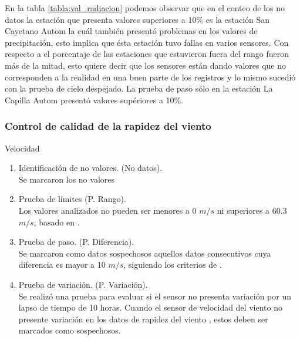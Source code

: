 En la tabla \ref{tabla:val_radiacion} podemos observar que en el conteo de los no datos la estación que presenta valores superiores a 10\% es la estación San Cayetano Autom la cuál también presentó problemas en los valores de precipitación, esto implica que ésta estación tuvo fallas en varios sensores. Con respecto a el porcentaje de las estaciones que estuvieron fuera del rango fueron más de la mitad, esto quiere decir que los sensores están dando valores que no corresponden a la realidad en una buen parte de los registros y lo mismo sucedió con la prueba de cielo despejado. La prueba de paso sólo en la estación La Capilla Autom presentó valores supériores a 10\%.

\subsubsection{Control de calidad de la rapidez del viento}

Velocidad

\begin{enumerate}
\item Identificación de no valores. (No datos).\\
Se marcaron los no valores

\item Prueba de límites (P. Rango).\\
Los valores analizados no pueden ser menores a 0 $m/s$ ni superiores a 60.3 $m/s$, basado en \citet{estevez2011}.

\item Prueba de paso. (P. Diferencia).\\
Se marcaron como datos sospechosos aquellos datos consecutivos cuya diferencia es mayor a 10 $m/s$, siguiendo los criterios de \citet{estevez2011}.

\item Prueba de variación. (P. Variación).\\

Se realizó una prueba para evaluar si el sensor no presenta variación por un lapso de tiempo de 10 horas. Cuando el sensor de velocidad del viento no presente variación en los datos de rapidez del viento , estos deben ser marcados como sospechosos.

\end{enumerate}

